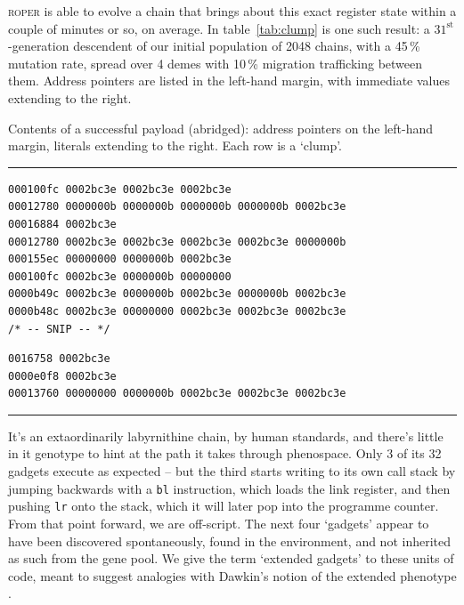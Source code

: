 \textsc{roper} is able to evolve a chain that brings about this
exact register state within a couple of minutes or so, on
average. In table~\ref{tab:clump} is one such result: a
$31^{\textrm{st}}$-generation descendent of our initial
population of 2048 chains, with a 45\,\% mutation rate, spread over
4 demes with 10\,\% migration trafficking between them. Address
pointers are listed in the left-hand margin, with immediate
values extending to the right. 
\begin{table}
\caption{Contents of a successful payload (abridged): address pointers on
the left-hand margin, literals extending to the right. Each row
is a `clump'.}
\label{tab:clump}
  \hrule
  {\tiny
\begin{verbatim}
000100fc 0002bc3e 0002bc3e 0002bc3e 
00012780 0000000b 0000000b 0000000b 0000000b 0002bc3e 
00016884 0002bc3e 
00012780 0002bc3e 0002bc3e 0002bc3e 0002bc3e 0000000b 
000155ec 00000000 0000000b 0002bc3e 
000100fc 0002bc3e 0000000b 00000000 
0000b49c 0002bc3e 0000000b 0002bc3e 0000000b 0002bc3e 
0000b48c 0002bc3e 00000000 0002bc3e 0002bc3e 0002bc3e 
/* -- SNIP -- */
\end{verbatim}

\begin{verbatim}
0016758 0002bc3e 
0000e0f8 0002bc3e 
00013760 00000000 0000000b 0002bc3e 0002bc3e 0002bc3e 
\end{verbatim}
  }
\hrule
\end{table}

It's an extaordinarily labyrnithine chain, by human standards,
and there's little in it genotype to hint at the path it takes
through phenospace. Only 3 of its 32 gadgets execute as expected -- but the
third starts writing to its own call stack by jumping
backwards with a \texttt{bl} instruction, which loads the link
register, and then pushing \texttt{lr} onto the stack, which it will later pop into
the programme counter. From that point forward, we are
off-script. The next four `gadgets' appear to have been discovered
spontaneously, found in the environment, and not inherited as such from the gene
pool. We give the term `extended gadgets' to these units of code, meant
to suggest analogies with Dawkin's notion of the extended phenotype
\cite{dawkins99}.

